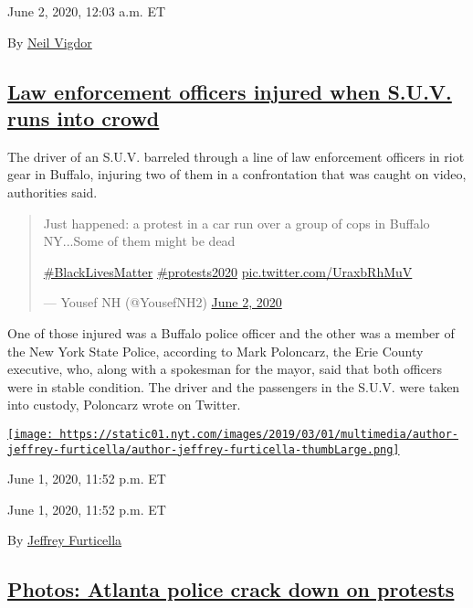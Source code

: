 June 2, 2020, 12:03 a.m. ET

By \href{https://www.nytimes.com/by/neil-vigdor}{Neil Vigdor}

\hypertarget{law-enforcement-officers-injured-when-suv-runs-into-crowd}{%
\subsection{\texorpdfstring{\protect\hyperlink{law-enforcement-officers-injured-when-suv-runs-into-crowd}{Law
enforcement officers injured when S.U.V. runs into
crowd}}{Law enforcement officers injured when S.U.V. runs into crowd}}\label{law-enforcement-officers-injured-when-suv-runs-into-crowd}}

The driver of an S.U.V. barreled through a line of law enforcement
officers in riot gear in Buffalo, injuring two of them in a
confrontation that was caught on video, authorities said.

\begin{quote}
Just happened: a protest in a car run over a group of cops in Buffalo
NY...Some of them might be dead

\href{https://twitter.com/hashtag/BlackLivesMatter?src=hash\&ref_src=twsrc\%5Etfw}{\#BlackLivesMatter}
\href{https://twitter.com/hashtag/protests2020?src=hash\&ref_src=twsrc\%5Etfw}{\#protests2020}
\href{https://t.co/UraxbRhMuV}{pic.twitter.com/UraxbRhMuV}

--- Yousef NH (@YousefNH2)
\href{https://twitter.com/YousefNH2/status/1267637687554650112?ref_src=twsrc\%5Etfw}{June
2, 2020}
\end{quote}

One of those injured was a Buffalo police officer and the other was a
member of the New York State Police, according to Mark Poloncarz, the
Erie County executive, who, along with a spokesman for the mayor, said
that both officers were in stable condition. The driver and the
passengers in the S.U.V. were taken into custody, Poloncarz wrote on
Twitter.

\href{https://www.nytimes.com/by/jeffrey-furticella}{\texttt{[image: https://static01.nyt.com/images/2019/03/01/multimedia/author-jeffrey-furticella/author-jeffrey-furticella-thumbLarge.png]}}

June 1, 2020, 11:52 p.m. ET

June 1, 2020, 11:52 p.m. ET

By \href{https://www.nytimes.com/by/jeffrey-furticella}{Jeffrey
Furticella}

\hypertarget{photos-atlanta-police-crack-down-on-protests}{%
\subsection{\texorpdfstring{\protect\hyperlink{photos-atlanta-police-crack-down-on-protests}{Photos:
Atlanta police crack down on
protests}}{Photos: Atlanta police crack down on protests}}\label{photos-atlanta-police-crack-down-on-protests}}


